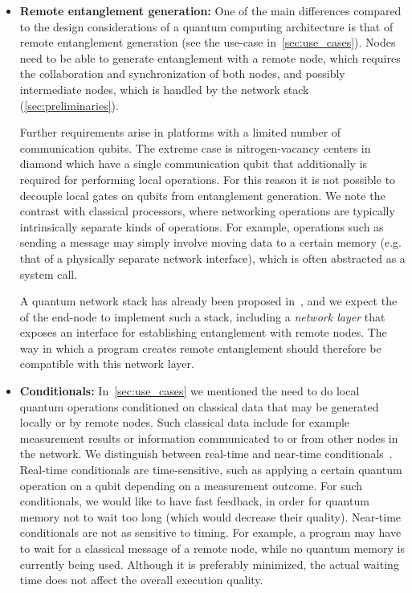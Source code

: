 \begin{itemize}
      \item \label{item:design_ent_gen} \textbf{Remote entanglement generation:}
            One of the main differences compared to the design considerations of a quantum computing architecture is that of remote entanglement
            generation (see the use-case in~\cref{sec:use_cases}).
            Nodes need to be able to generate entanglement with a remote node, which requires the collaboration and synchronization of both nodes, and possibly intermediate nodes, which is handled by the network stack (\cref{sec:preliminaries}).

            Further requirements arise in platforms with a limited number of communication qubits.
            The extreme case is nitrogen-vacancy centers in diamond which have a single communication qubit that additionally is required for performing local operations.
            For this reason it is not possible to decouple local gates on qubits from entanglement
            generation.
            We note the contrast with classical processors, where networking operations are typically intrinsically separate kinds of operations.
            For example, operations such as sending a message may simply involve moving data to a certain memory (e.g. that of a physically separate network interface), which is often abstracted as a system call.

            A quantum network stack has already been proposed in~\cite{dahlberg2019linklayer,kozlowski2020networklayer}, and we expect the \QNPU of the end-node to implement such a stack, including a \textit{network layer} that exposes an interface for establishing entanglement with remote nodes.
            The way in which a program creates remote entanglement should therefore be compatible with this network layer.

      \item \label{item:design_cond} \textbf{Conditionals:}
            In~\cref{sec:use_cases} we mentioned the need to do local quantum operations conditioned on classical data that may be generated locally or by remote nodes. Such classical data include for example measurement results or information communicated to or from other nodes in the network.
            We distinguish between real-time and near-time conditionals~\cite{cross2021openqasm}.
            Real-time conditionals are time-sensitive, such as applying a certain quantum operation on a qubit depending on a measurement outcome.
            For such conditionals, we would like to have fast feedback, in order for quantum memory not to wait too long (which would decrease their quality).
            Near-time conditionals are not as sensitive to timing.
            For example, a program may have to wait for a classical message of a remote node, while no quantum memory is currently being used.
            Although it is preferably minimized, the actual waiting time does not affect the overall execution quality.



\end{itemize}
